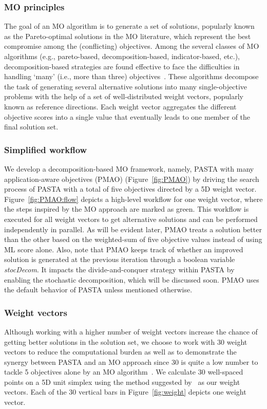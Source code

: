 \documentclass[a4paper,fleqn, review]{cas-dc}
\begin{document}
\subsubsection{MO principles}
The goal of an MO algorithm is to generate a set of solutions, popularly known as the Pareto-optimal solutions in the MO literature, which represent the best compromise among the (conflicting) objectives.
Among the several classes of MO algorithms (e.g., pareto-based, decomposition-based, indicator-based, etc.), decomposition-based strategies are found effective to face the difficulties in handling `many' (i.e., more than three) objectives~\cite{li2015many}. These algorithms decompose the task of generating several alternative solutions into many single-objective problems with the help of a set of well-distributed weight vectors, popularly known as reference directions. Each weight vector aggregates the different objective scores into a single value that eventually leads to one member of the final solution set.

\subsubsection{Simplified workflow}
We develop a decomposition-based MO framework, namely, PASTA with many application-aware objectives (PMAO) (Figure~\ref{fig:PMAO}) by driving the search process of PASTA with a total of five objectives directed by a 5D weight vector. Figure~\ref{fig:PMAO:flow} depicts a high-level workflow for one weight vector, where the steps inspired by the MO approach are marked as green. This workflow is executed for all weight vectors to get alternative solutions and can be performed independently in parallel. As will be evident later, PMAO treats a solution better than the other based on the weighted-sum of five objective values instead of using ML score alone. Also, note that PMAO keeps track of whether an improved solution is generated at the previous iteration through a boolean variable \textit{stocDecom}. It impacts the divide-and-conquer strategy within PASTA by enabling the stochastic decomposition, which will be discussed soon. PMAO uses the default behavior of PASTA unless mentioned otherwise.

\subsubsection{Weight vectors}
Although working with a higher number of weight vectors increase the chance of getting better solutions in the solution set, we choose to work with 30 weight vectors to reduce the computational burden as well as to demonstrate the synergy between PASTA and an MO approach since 30 is quite a low number to tackle 5 objectives alone by an MO algorithm~\cite{deb2014evolutionary}. We calculate 30 well-spaced points on a 5D unit simplex using the method suggested by~\cite{ref_dirs_energy} as our weight vectors. Each of the 30 vertical bars in Figure~\ref{fig:weight} depicts one weight vector. 
\end{document}
